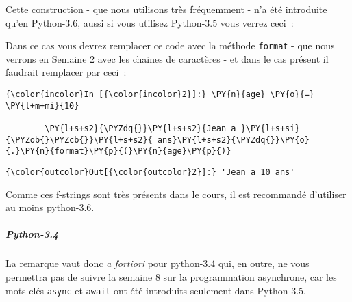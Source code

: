     Cette construction - que nous utilisons très fréquemment - n'a été
introduite qu'en Python-3.6, aussi si vous utilisez Python-3.5 vous
verrez ceci~:

\begin{Shaded}
\begin{Highlighting}[frame=lines,framerule=0.6mm,rulecolor=\color{asisframecolor}]
\OperatorTok{>>>}\OperatorTok{=} 
\OperatorTok{>>>} \SpecialCharTok{\{}\SpecialCharTok{\}}
    \SpecialCharTok{\{}\SpecialCharTok{\}}
                      \OperatorTok{^}
\end{Highlighting}
\end{Shaded}

    Dans ce cas vous devrez remplacer ce code avec la méthode
\texttt{format} - que nous verrons en Semaine 2 avec les chaines de
caractères - et dans le cas présent il faudrait remplacer par ceci~:

    \begin{Verbatim}[commandchars=\\\{\},frame=single,framerule=0.3mm,rulecolor=\color{cellframecolor}]
{\color{incolor}In [{\color{incolor}2}]:} \PY{n}{age} \PY{o}{=} \PY{l+m+mi}{10}
        
        \PY{l+s+s2}{\PYZdq{}}\PY{l+s+s2}{Jean a }\PY{l+s+si}{\PYZob{}\PYZcb{}}\PY{l+s+s2}{ ans}\PY{l+s+s2}{\PYZdq{}}\PY{o}{.}\PY{n}{format}\PY{p}{(}\PY{n}{age}\PY{p}{)}
\end{Verbatim}


\begin{Verbatim}[commandchars=\\\{\},frame=single,framerule=0.3mm,rulecolor=\color{cellframecolor}]
{\color{outcolor}Out[{\color{outcolor}2}]:} 'Jean a 10 ans'
\end{Verbatim}
            
    Comme ces f-strings sont très présents dans le cours, il est recommandé
d'utiliser au moins python-3.6.

    \hypertarget{python-3.4}{%
\subparagraph{Python-3.4}\label{python-3.4}}

    La remarque vaut donc \emph{a fortiori} pour python-3.4 qui, en outre,
ne vous permettra pas de suivre la semaine 8 sur la programmation
asynchrone, car les mots-clés \texttt{async} et \texttt{await} ont été
introduits seulement dans Python-3.5.

